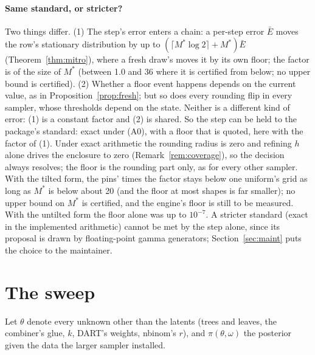 \paragraph{Same standard, or stricter?} Two things differ. (1) The step's error enters a chain: a per-step
error $\bar E$ moves the row's stationary distribution by up to $(\lceil M^*\log2\rceil+M^*)\bar E$
(Theorem~\ref{thm:mitro}), where a fresh draw's moves it by its own floor; the factor is of the size of $M^*$
(between 1.0 and 36 where it is certified from below; no upper bound is certified). (2) Whether a floor event
happens depends on the current value, as in Proposition~\ref{prop:fresh}; but so does every rounding flip in every
sampler, whose thresholds depend on the state. Neither is a different kind of error: (1) is a constant factor and
(2) is shared. So the step can be held to the package's standard: exact under (A0), with a floor that is quoted,
here with the factor of (1). Under exact arithmetic the rounding radius is zero and refining $h$ alone drives the
enclosure to zero (Remark~\ref{rem:coverage}), so the decision always resolves; the floor is the rounding part
only, as for every other sampler. With the tilted form, the pins' \FLOORSTEP{} times the factor stays below one
uniform's grid as long as $M^*$ is below about 20 (and the floor at most shapes is far smaller); no upper bound on
$M^*$ is certified, and the engine's floor is still to be measured. With the untilted form the floor alone was up to $10^{-7}$. A stricter standard (exact in the implemented arithmetic) cannot be met by the step
alone, since its proposal is drawn by floating-point gamma generators; Section~\ref{sec:maint} puts the choice to
the maintainer.

\section{The sweep}\label{sec:sweep}

Let $\theta$ denote every unknown other than the latents (trees and leaves, the combiner's glue, $k$, DART's
weights, nbinom's $r$), and $\pi(\theta,\omega)$ the posterior given the data the larger sampler installed.

